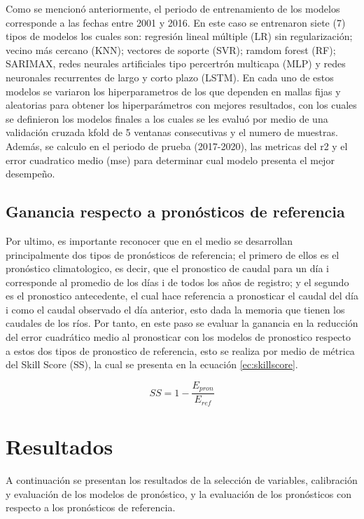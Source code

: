 \documentclass[draft]{agujournal2019}
\begin{document}
Como se mencionó anteriormente, el periodo de entrenamiento de los modelos corresponde a las fechas entre 2001 y 2016. En este caso se entrenaron siete (7) tipos de modelos los cuales son: regresión lineal múltiple (LR) sin regularización; vecino más cercano (KNN); vectores de soporte (SVR); ramdom forest (RF); SARIMAX, redes neurales artificiales tipo percertrón multicapa (MLP) y redes neuronales recurrentes de largo y corto plazo (LSTM). En cada uno de estos modelos se variaron los hiperparametros de los que dependen en mallas fijas y aleatorias para obtener los hiperparámetros con mejores resultados, con los cuales se definieron los modelos finales a los cuales se les evaluó por medio de una validación cruzada kfold de 5 ventanas consecutivas y el numero de muestras. Además, se calculo en el periodo de prueba (2017-2020), las metricas del r2 y el error cuadratico medio (mse) para determinar cual modelo presenta el mejor desempeño.

\subsection{Ganancia respecto a pronósticos de referencia}

Por ultimo, es importante reconocer que en el medio se desarrollan principalmente dos tipos de pronósticos de referencia; el primero de ellos es el pronóstico climatologico, es decir, que el pronostico de caudal para un día i corresponde al promedio de los días i de todos los años de registro; y el segundo es el pronostico antecedente, el cual hace referencia a pronosticar el caudal del día i como el caudal observado el día anterior, esto dada la memoria que tienen los caudales de los ríos. Por tanto, en este paso se evaluar la ganancia en la reducción del error cuadrático medio al pronosticar con los modelos de pronostico respecto a estos dos tipos de pronostico de referencia, esto se realiza por medio de métrica del Skill Score (SS), la cual se presenta en la ecuación \ref{ec:skillscore}.


\begin{equation}
	SS = 1 - \frac{E_{pron}}{E_{ref}}
	\label{ec:skillscore}
\end{equation}

\section{Resultados} 

A continuación se presentan los resultados de la selección de variables, calibración y evaluación de los modelos de pronóstico, y la evaluación de los pronósticos con respecto a los pronósticos de referencia.
\end{document}
